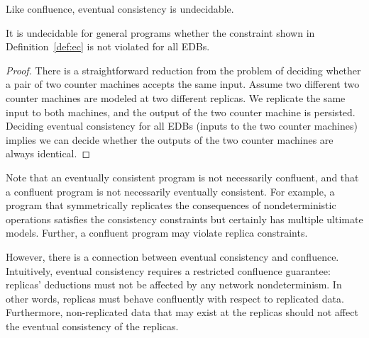 Like confluence, eventual consistency is undecidable.

\begin{lemma}
It is undecidable for general \lang programs whether the constraint shown in Definition~\ref{def:ec} is not violated for all EDBs.
\end{lemma}
\begin{proof}
There is a straightforward reduction from the problem of deciding whether a pair of two counter machines accepts the same input.  Assume two different two counter machines are modeled at two different replicas.  We replicate the same input to both machines, and the output of the two counter machine is persisted.  Deciding eventual consistency for all EDBs (inputs to the two counter machines) implies we can decide whether the outputs of the two counter machines are always identical.
\end{proof}



Note that an eventually consistent program is not necessarily confluent, and that
a confluent program is not necessarily eventually consistent.  For example, a program
that symmetrically replicates the consequences of nondeterministic operations satisfies
the consistency constraints but certainly has multiple ultimate models.  Further, a confluent
program may violate replica constraints.

However, there is a connection between eventual consistency and confluence.  Intuitively, eventual consistency requires a restricted confluence guarantee: replicas' deductions must not be affected by any network nondeterminism.  In other words, replicas must behave confluently with respect to replicated data.  Furthermore, non-replicated data that may exist at the replicas should not affect the eventual consistency of the replicas.

